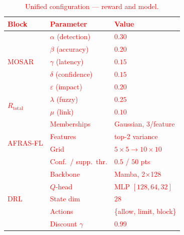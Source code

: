 \documentclass[journal]{IEEEtran}
\newcommand{\rev}[1]{\textcolor{red}{#1}}
\begin{document}
\begin{table}[!htbp]
\centering
\rev{\caption{Unified configuration --- reward and model.}\label{tab:config}}
\rev{\footnotesize
\setlength{\tabcolsep}{4pt}
\begin{tabular}{@{}lll@{}}
\toprule
\textbf{Block} & \textbf{Parameter} & \textbf{Value} \\
\midrule
\multirow{5}{*}{MOSAR}
  & $\alpha$ (detection)      & $0.30$ \\
  & $\beta$  (accuracy)       & $0.20$ \\
  & $\gamma$ (latency)        & $0.15$ \\
  & $\delta$ (confidence)     & $0.15$ \\
  & $\varepsilon$ (impact)    & $0.20$ \\
\midrule
\multirow{2}{*}{$R_{\text{total}}$}
  & $\lambda$ (fuzzy)         & $0.25$ \\
  & $\mu$     (link)          & $0.10$ \\
\midrule
\multirow{4}{*}{AFRAS-FL}
  & Memberships               & Gaussian, 3/feature \\
  & Features                  & top-2 variance \\
  & Grid                      & $5{\times}5 \to 10{\times}10$ \\
  & Conf.\ / supp.\ thr.      & $0.5$ / $50$ pts \\
\midrule
\multirow{5}{*}{DRL}
  & Backbone                  & Mamba, 2$\times$128 \\
  & $Q$-head                  & MLP $[128,64,32]$ \\
  & State dim                 & $28$ \\
  & Actions                   & \{allow, limit, block\} \\
  & Discount $\gamma$         & $0.99$ \\
\bottomrule
\end{tabular}}
\end{table}
\end{document}
